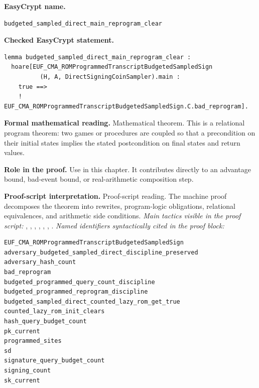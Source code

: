 \begin{formaltheorem}
\end{formaltheorem}

\begin{formaltheorem}
\noindent\textbf{EasyCrypt name.}
\begin{lstlisting}[language=EasyCrypt,basicstyle=\ttfamily\scriptsize]
budgeted_sampled_direct_main_reprogram_clear
\end{lstlisting}
\noindent\textbf{Checked EasyCrypt statement.}
\begin{lstlisting}[language=EasyCrypt,basicstyle=\ttfamily\scriptsize]
lemma budgeted_sampled_direct_main_reprogram_clear :
  hoare[EUF_CMA_ROMProgrammedTranscriptBudgetedSampledSign
          (H, A, DirectSigningCoinSampler).main :
    true ==>
    ! EUF_CMA_ROMProgrammedTranscriptBudgetedSampledSign.C.bad_reprogram].
\end{lstlisting}
\noindent\textbf{Formal mathematical reading.}
Mathematical theorem. This is a relational program theorem: two games or procedures are coupled so that a precondition on their initial states implies the stated postcondition on final states and return values.

\noindent\textbf{Role in the proof.}
Use in this chapter. It contributes directly to an advantage bound, bad-event bound, or real-arithmetic composition step.

\noindent\textbf{Proof-script interpretation.}
Proof-script reading. The machine proof decomposes the theorem into rewrites, program-logic obligations, relational equivalences, and arithmetic side conditions.
\emph{Main tactics visible in the proof script:} , , , , , , .
\emph{Named identifiers syntactically cited in the proof block:}
\begin{lstlisting}[language=EasyCrypt,basicstyle=\ttfamily\scriptsize]
EUF_CMA_ROMProgrammedTranscriptBudgetedSampledSign
adversary_budgeted_sampled_direct_discipline_preserved
adversary_hash_count
bad_reprogram
budgeted_programmed_query_count_discipline
budgeted_programmed_reprogram_discipline
budgeted_sampled_direct_counted_lazy_rom_get_true
counted_lazy_rom_init_clears
hash_query_budget_count
pk_current
programmed_sites
sd
signature_query_budget_count
signing_count
sk_current
\end{lstlisting}

\end{formaltheorem}

